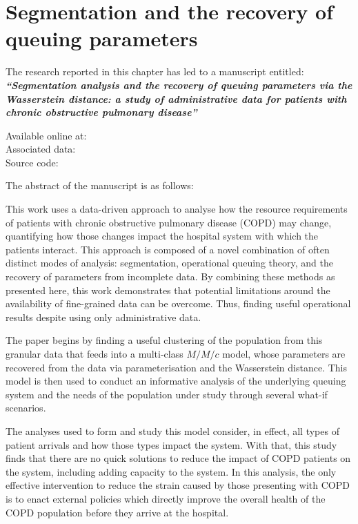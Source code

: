 \chapter{Segmentation and the recovery of queuing parameters}

\graphicspath{{chapters/copd/paper/img/}}


\begin{center}
    The research reported in this chapter has led to a manuscript
    entitled:\\[1em]

    {%
        \bf\itshape{``Segmentation analysis and the recovery of queuing
                    parameters via the Wasserstein distance: a study of
                    administrative data for patients with chronic obstructive
                    pulmonary disease''}
    }

    Available online at: \\
    Associated data: \\
    Source code: \vfill

    The abstract of the manuscript is as follows:\\[1em]
\end{center}

This work uses a data-driven approach to analyse how the resource requirements
of patients with chronic obstructive pulmonary disease (COPD) may change,
quantifying how those changes impact the hospital system with which the patients
interact. This approach is composed of a novel combination of often distinct
modes of analysis: segmentation, operational queuing theory, and the recovery of
parameters from incomplete data. By combining these methods as presented here,
this work demonstrates that potential limitations around the availability of
fine-grained data can be overcome. Thus, finding useful operational results
despite using only administrative data.

The paper begins by finding a useful clustering of the population from this
granular data that feeds into a multi-class \(M/M/c\) model, whose parameters
are recovered from the data via parameterisation and the Wasserstein distance.
This model is then used to conduct an informative analysis of the underlying
queuing system and the needs of the population under study through several
what-if scenarios.

The analyses used to form and study this model consider, in effect, all types of
patient arrivals and how those types impact the system. With that, this study
finds that there are no quick solutions to reduce the impact of COPD patients on
the system, including adding capacity to the system. In this analysis, the only
effective intervention to reduce the strain caused by those presenting with COPD
is to enact external policies which directly improve the overall health of the
COPD population before they arrive at the hospital.

